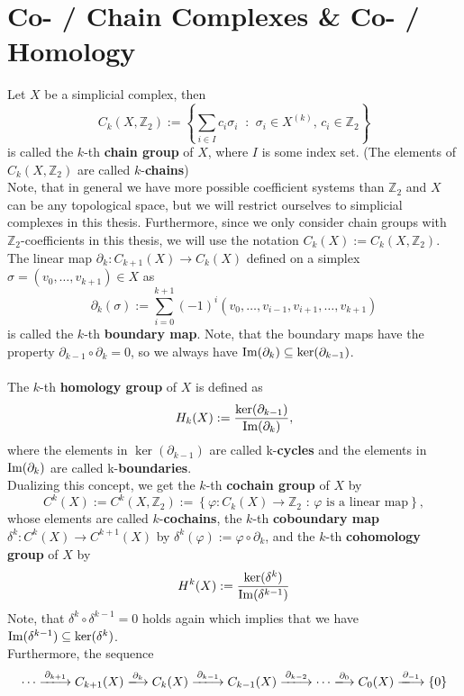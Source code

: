 \section*{Co- / Chain Complexes \& Co- / Homology}

Let \(X\) be a simplicial complex, then
\[
C_k(X,\mathbb{Z}_2):=\left\{\sum\limits_{i\in I}c_i\sigma_i\:\text{ : }\:\sigma_i\in X^{(k)}\text{, }c_i\in\mathbb{Z}_2\right\}
\]
is called the \(k\)-th \textbf{chain group} of \(X\), where \(I\) is some index set. (The elements of \(C_k(X,\mathbb{Z}_2)\) are called \(k\)-\textbf{chains})\\
Note, that in general we have more possible coefficient systems than \(\mathbb{Z}_2\) and \(X\) can be any topological space, but we will restrict ourselves to simplicial complexes in this thesis. Furthermore, since we only consider chain groups with \(\mathbb{Z}_2\)-coefficients in this thesis, we will use the notation \(C_k(X):=C_k(X,\mathbb{Z}_2)\).\\
The linear map \(\partial_k:C_{k+1}(X)\rightarrow C_k(X)\) defined on a simplex \(\sigma=(v_0,\ldots,v_{k+1})\in X\) as
\[
\partial_k(\sigma):=\sum\limits_{i=0}^{k+1}(-1)^i(v_0,\ldots,v_{i-1},v_{i+1},\ldots,v_{k+1})
\]
is called the \(k\)-th \textbf{boundary map}. Note, that the boundary maps have the property \(\partial_{k-1}\circ\partial_k=0\), so we always have \(\mathrm{Im}(\partial_k)\subseteq\ker(\partial_{k-1})\).\\
\\
The \(k\)-th \textbf{homology group} of \(X\) is defined as
\[
H_k(X):=\frac{\ker(\partial_{k-1})}{\mathrm{Im}(\partial_k)},
\]
where the elements in \(\ker(\partial_{k-1})\) are called k-\textbf{cycles} and the elements in \(\mathrm{Im}(\partial_k)\) are called k-\textbf{boundaries}.\\
Dualizing this concept, we get the \(k\)-th \textbf{cochain group} of \(X\) by
\[
C^k(X):=C^k(X,\mathbb{Z}_2):=\left\{\varphi:C_k(X)\rightarrow\mathbb{Z}_2\text{ : }\varphi\text{ is a linear map}\right\},
\]
whose elements are called \(k\)-\textbf{cochains}, the \(k\)-th \textbf{coboundary map}\\
\(\delta^k:C^k(X)\rightarrow C^{k+1}(X)\) by \(\delta^k(\varphi):=\varphi\circ\partial_k\), and the \(k\)-th \textbf{cohomology group} of \(X\) by
\[
H^k(X):=\frac{\ker(\delta^k)}{\mathrm{Im}(\delta^{k-1})}
\]
Note, that \(\delta^k\circ\delta^{k-1}=0\) holds again which implies that we have \(\mathrm{Im}(\delta^{k-1})\subseteq\ker(\delta^k)\).\\
Furthermore, the sequence
\[
\cdots\xlongrightarrow{\partial_{k+1}} C_{k+1}(X)\xlongrightarrow{\partial_k} C_k(X)\xlongrightarrow{\partial_{k-1}} C_{k-1}(X)\xlongrightarrow{\partial_{k-2}}\cdots\xlongrightarrow{\partial_0} C_0(X)\xlongrightarrow{\partial_{-1}}\left\{0\right\}
\]
